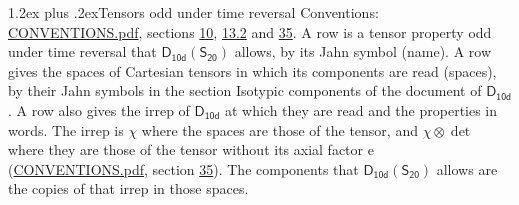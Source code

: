 \documentclass[10pt,a4paper]{article}
\makeatletter
\renewcommand\section{\@startsection{section}{1}{\z@}{-3ex plus -1ex minus -.2ex}%
  {1.2ex plus .2ex}{\normalfont\large\sffamily\bfseries\color{parttitle}}}
\numberwithin{equation}{section}
\newcommand{\grp}[1]{\mathsf{#1}}
\newcommand{\irrprod}{\otimes}
\makeatother
\begin{document}
\section{Tensors odd under time reversal}\label{s:time_odd}
Conventions: \href{../../CONVENTIONS.pdf}{CONVENTIONS.pdf}, sections \href{../../../rotation/CONVENTIONS.pdf\#conv.10}{10}, \href{../../../rotation/CONVENTIONS.pdf\#conv.13.2}{13.2} and \href{../../CONVENTIONS.pdf\#conv.35}{35}.
\leavevmode\label{n:head.name.property}A row is a tensor property odd under time reversal that $\grp{D_{10d}}(\grp{S_{20}})$ allows, by its Jahn symbol (name). \label{n:head.spaces}A row gives the spaces of Cartesian tensors in which its components are read (spaces), by their Jahn symbols in the section Isotypic components of the document of \href{../../../rotation/data/pdf/D10d.pdf}{$\grp{D_{10d}}$}. \label{n:head.properties}A row also gives the irrep of $\grp{D_{10d}}$ at which they are read and the properties in words. The irrep is $\chi$ where the spaces are those of the tensor, and $\chi \irrprod \det$ where they are those of the tensor without its axial factor e (\href{../../CONVENTIONS.pdf}{CONVENTIONS.pdf}, section \href{../../CONVENTIONS.pdf\#conv.35}{35}). The components that $\grp{D_{10d}}(\grp{S_{20}})$ allows are the copies of that irrep in those spaces.
\end{document}
